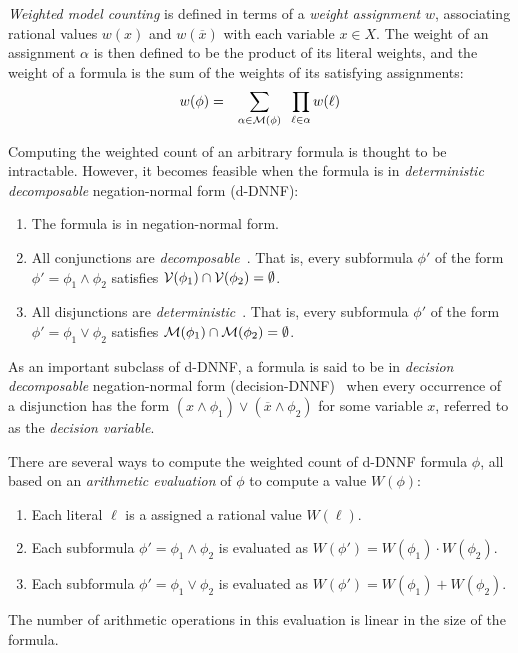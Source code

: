 \documentclass{easychair}
\newcommand{\obar}[1]{\overline{#1}}
\newcommand{\lit}{\ell}
\newcommand{\varset}{X}
\newcommand{\dependencyset}{{\cal V}}
\newcommand{\assign}{\alpha}
\newcommand{\modelset}{{\cal M}}
\begin{document}
\emph{Weighted model counting} is defined in terms of a \emph{weight
  assignment} $w$, associating rational values $w(x)$ and
$w(\obar{x})$ with each variable $x \in \varset$.
The weight of an
assignment $\assign$ is then defined to be the product of its literal weights, and the weight
of a formula is the sum of the weights of its satisfying assignments:
\begin{eqnarray}
  w(\phi) & = & \sum_{\assign \in \modelset(\phi)} \;\;\prod_{\lit \in \assign} w(\lit) \label{eqn:wmc}
\end{eqnarray}

Computing the weighted count of an arbitrary formula is thought to be intractable.  However, it becomes
feasible when the formula is in \emph{deterministic decomposable} negation-normal form (d-DNNF):
\begin{enumerate}
\item The formula is in negation-normal form.  
\item All conjunctions are \emph{decomposable}~\cite{darwiche:jacm:2001,darwiche:jair:2002}.  That is, every subformula $\phi'$ of the form $\phi' = \phi_1 \land \phi_2$
  satisfies $\dependencyset(\phi_1) \cap \dependencyset(\phi_2) = \emptyset$.
\item All disjunctions are \emph{deterministic}~\cite{darwiche:jair:2002,darwiche:jancl:2001}.  That is, every subformula $\phi'$ of the form $\phi' =\phi_1 \lor \phi_2$ satisfies
  $\modelset(\phi_1) \cap \modelset(\phi_2) = \emptyset$.
\end{enumerate}
As an important subclass of d-DNNF, a formula is said to be in 
\emph{decision decomposable} negation-normal form (decision-DNNF)~\cite{huang:jair:2007} when every occurrence of a disjunction has the form 
$(x \land \phi_1) \lor (\obar{x} \land \phi_2)$ for some variable $x$, referred to as the \emph{decision variable}.

There are several ways to compute the weighted count of d-DNNF formula $\phi$, all
based on an \emph{arithmetic evaluation} of $\phi$ to compute a value $W(\phi)$:
\begin{enumerate}
\item Each literal $\lit$ is a assigned a rational value $W(\lit)$.
\item Each subformula $\phi' = \phi_1 \land \phi_2$ is evaluated as $W(\phi') = W(\phi_1) \cdot W(\phi_2)$.
\item Each subformula $\phi' = \phi_1 \lor \phi_2$ is evaluated as $W(\phi') = W(\phi_1) + W(\phi_2)$.
\end{enumerate}
The number of arithmetic operations in this evaluation is linear in the size of the formula.
\end{document}
